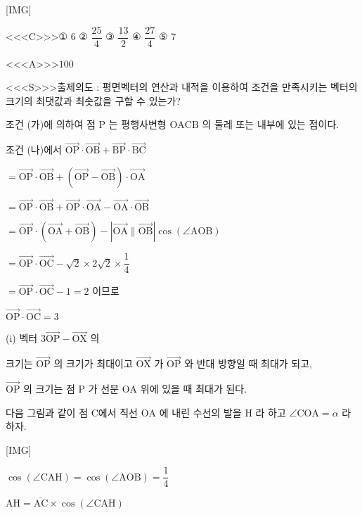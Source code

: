 \documentclass{oblivoir}
\begin{document}
[IMG]


<<<C>>>① $6$
② $\dfrac{25}{4}$
③ $\dfrac{13}{2}$
④ $\dfrac{27}{4}$
⑤ $7$


<<<A>>>$100$

<<<S>>>출제의도 : 평면벡터의 연산과 내적을 이용하여 조건을 만족시키는 벡터의 크기의 최댓값과 최솟값을 구할 수 있는가?

조건 (가)에 의하여 점 $\mathrm{P}$ 는 평행사변형 $\mathrm{OACB}$ 의 둘레 또는 내부에 있는 점이다.

조건 (나)에서
$\overrightarrow{\mathrm{OP}} \cdot \overrightarrow{\mathrm{OB}}+\overrightarrow{\mathrm{BP}} \cdot \overrightarrow{\mathrm{BC}}$

$=\overrightarrow{\mathrm{OP}} \cdot \overrightarrow{\mathrm{OB}}+(\overrightarrow{\mathrm{OP}}-\overrightarrow{\mathrm{OB}}) \cdot \overrightarrow{\mathrm{OA}}$

$=\overrightarrow{\mathrm{OP}} \cdot \overrightarrow{\mathrm{OB}}+\overrightarrow{\mathrm{OP}} \cdot \overrightarrow{\mathrm{OA}}-\overrightarrow{\mathrm{OA}} \cdot \overrightarrow{\mathrm{OB}}$

$=\overrightarrow{\mathrm{OP}} \cdot(\overrightarrow{\mathrm{OA}}+\overrightarrow{\mathrm{OB}})-|\overrightarrow{\mathrm{OA}} \| \overrightarrow{\mathrm{OB}}| \cos (\angle \mathrm{AOB})$

$=\overrightarrow{\mathrm{OP}} \cdot \overrightarrow{\mathrm{OC}}-\sqrt{2} \times 2 \sqrt{2} \times \dfrac{1}{4}$

$=\overrightarrow{\mathrm{OP}} \cdot \overrightarrow{\mathrm{OC}}-1=2$
이므로

$\overrightarrow{\mathrm{OP}} \cdot \overrightarrow{\mathrm{OC}}=3$

(i) 벡터 $3 \overrightarrow{\mathrm{OP}}-\overrightarrow{\mathrm{OX}}$ 의

크기는 $\overrightarrow{\mathrm{OP}}$ 의 크기가 최대이고 $\overrightarrow{\mathrm{OX}}$ 가 $\overrightarrow{\mathrm{OP}}$ 와 반대 방향일 때 최대가 되고,

$\overrightarrow{\mathrm{OP}}$ 의 크기는 점 $\mathrm{P}$ 가 선분 $\mathrm{OA}$ 위에 있을 때 최대가 된다.

다음 그림과 같이 점 $\mathrm{C}$에서 직선 $\mathrm{OA}$ 에 내린 수선의 발을 $\mathrm{H}$ 라 하고 $\angle \mathrm{COA}=\alpha$ 라 하자.

[IMG]

$\cos (\angle \mathrm{CAH})=\cos (\angle \mathrm{AOB})=\dfrac{1}{4}$

$\mathrm{AH} =\overline{\mathrm{AC}} \times \cos (\angle \mathrm{CAH})$
\end{document}
